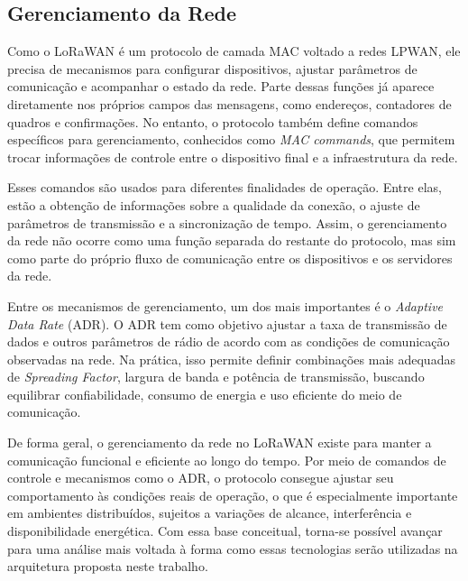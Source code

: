 
\subsection{Gerenciamento da Rede}

Como o LoRaWAN é um protocolo de camada MAC voltado a redes LPWAN, ele precisa de mecanismos para configurar dispositivos, ajustar parâmetros de comunicação e acompanhar o estado da rede. Parte dessas funções já aparece diretamente nos próprios campos das mensagens, como endereços, contadores de quadros e confirmações. No entanto, o protocolo também define comandos específicos para gerenciamento, conhecidos como \textit{MAC commands}, que permitem trocar informações de controle entre o dispositivo final e a infraestrutura da rede. \cite{hessel2023lorawan}

Esses comandos são usados para diferentes finalidades de operação. Entre elas, estão a obtenção de informações sobre a qualidade da conexão, o ajuste de parâmetros de transmissão e a sincronização de tempo. Assim, o gerenciamento da rede não ocorre como uma função separada do restante do protocolo, mas sim como parte do próprio fluxo de comunicação entre os dispositivos e os servidores da rede. 

Entre os mecanismos de gerenciamento, um dos mais importantes é o \textit{Adaptive Data Rate} (ADR). O ADR tem como objetivo ajustar a taxa de transmissão de dados e outros parâmetros de rádio de acordo com as condições de comunicação observadas na rede. Na prática, isso permite definir combinações mais adequadas de \textit{Spreading Factor}, largura de banda e potência de transmissão, buscando equilibrar confiabilidade, consumo de energia e uso eficiente do meio de comunicação.

De forma geral, o gerenciamento da rede no LoRaWAN existe para manter a comunicação funcional e eficiente ao longo do tempo. Por meio de comandos de controle e mecanismos como o ADR, o protocolo consegue ajustar seu comportamento às condições reais de operação, o que é especialmente importante em ambientes distribuídos, sujeitos a variações de alcance, interferência e disponibilidade energética. Com essa base conceitual, torna-se possível avançar para uma análise mais voltada à forma como essas tecnologias serão utilizadas na arquitetura proposta neste trabalho.


